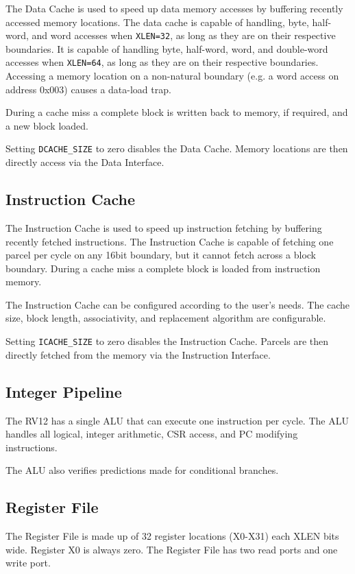 The Data Cache is used to speed up data memory accesses by buffering
recently accessed memory locations. The data cache is capable of
handling, byte, half-word, and word accesses when \texttt{XLEN=32}, as long as
they are on their respective boundaries. It is capable of handling byte,
half-word, word, and double-word accesses when \texttt{XLEN=64}, as long as they
are on their respective boundaries. Accessing a memory location on a
non-natural boundary (e.g. a word access on address 0x003) causes a
data-load trap.

During a cache miss a complete block is written back to memory, if
required, and a new block loaded.

Setting \texttt{DCACHE\_SIZE} to zero disables the Data Cache. Memory locations
are then directly access via the Data Interface.

\subsection{Instruction Cache}\label{instruction-cache}

The Instruction Cache is used to speed up instruction fetching by
buffering recently fetched instructions. The Instruction Cache is
capable of fetching one parcel per cycle on any 16bit boundary, but it
cannot fetch across a block boundary. During a cache miss a complete
block is loaded from instruction memory.

The Instruction Cache can be configured according to the user's needs.
The cache size, block length, associativity, and replacement algorithm
are configurable.

Setting \texttt{ICACHE\_SIZE} to zero disables the Instruction Cache. Parcels are
then directly fetched from the memory via the Instruction Interface.

\subsection{Integer Pipeline}\label{integer-pipeline}

The RV12 has a single ALU that can execute one instruction per cycle.
The ALU handles all logical, integer arithmetic, CSR access, and PC
modifying instructions.

The ALU also verifies predictions made for conditional branches.

\subsection{Register File}\label{register-file}

The Register File is made up of 32 register locations (X0-X31) each XLEN
bits wide. Register X0 is always zero. The Register File has two read
ports and one write port.